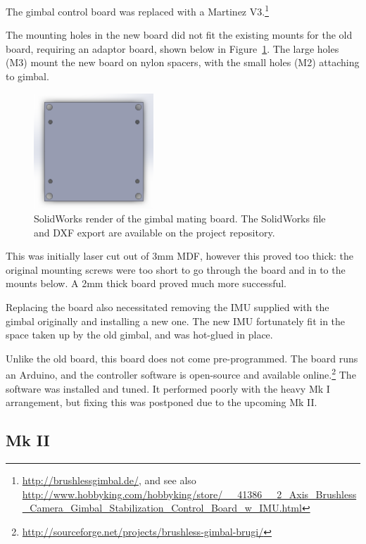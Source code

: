\documentclass[12pt,oneside,a4paper]{book}
\begin{document}
The gimbal control board was replaced with a Martinez
V3.\footnote{\url{http://brushlessgimbal.de/}, and see also \url{http://www.hobbyking.com/hobbyking/store/__41386__2_Axis_Brushless_Camera_Gimbal_Stabilization_Control_Board_w_IMU.html}}

The mounting holes in the new board did not fit the existing
mounts for the old board, requiring an adaptor board, shown below in
Figure~\ref{fig:gmb}. The large holes (M3) mount the new board on
nylon spacers, with the small holes (M2) attaching to gimbal.

\begin{figure}[h]
  \centering
  \includegraphics[width=0.4\textwidth]{figs/gmb}
  \caption{SolidWorks render of the gimbal mating board. The
    SolidWorks file and DXF export are available on the project repository.}
  \label{fig:gmb}
\end{figure}

This was initially laser cut out of 3mm MDF,
however this proved too thick: the original mounting screws were too
short to go through the board and in to the mounts below. A 2mm thick board
proved much more successful.
 
Replacing the board also necessitated removing the IMU supplied with
the gimbal originally and installing a new one. The new IMU
fortunately fit in the space taken up by the old gimbal, and was
hot-glued in place.

Unlike the old board, this board does not come pre-programmed. The
board runs an Arduino, and the controller software is open-source and
available online.\footnote{\url{http://sourceforge.net/projects/brushless-gimbal-brugi/}} The software was installed and
tuned. It performed poorly with the heavy Mk I arrangement, but fixing
this was postponed due to the upcoming Mk II.

\subsection{Mk II}
\label{sec:mk-ii}
\end{document}
